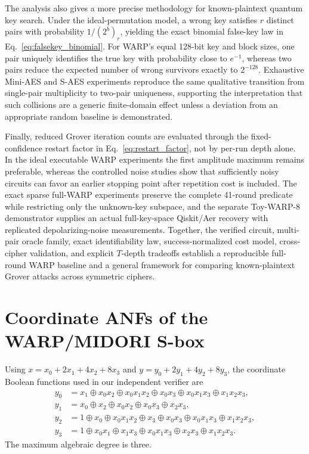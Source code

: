 \documentclass[10pt,a4paper]{article}
\begin{document}
The analysis also gives a more precise methodology for known-plaintext quantum key search.  Under the ideal-permutation model, a wrong key satisfies $r$ distinct pairs with probability $1/(2^b)_r$, yielding the exact binomial false-key law in Eq.~\eqref{eq:falsekey_binomial}.  For WARP's equal 128-bit key and block sizes, one pair uniquely identifies the true key with probability close to $e^{-1}$, whereas two pairs reduce the expected number of wrong survivors exactly to $2^{-128}$.  Exhaustive Mini-AES and S-AES experiments reproduce the same qualitative transition from single-pair multiplicity to two-pair uniqueness, supporting the interpretation that such collisions are a generic finite-domain effect unless a deviation from an appropriate random baseline is demonstrated.

Finally, reduced Grover iteration counts are evaluated through the fixed-confidence restart factor in Eq.~\eqref{eq:restart_factor}, not by per-run depth alone.  In the ideal executable WARP experiments the first amplitude maximum remains preferable, whereas the controlled noise studies show that sufficiently noisy circuits can favor an earlier stopping point after repetition cost is included.  The exact sparse full-WARP experiments preserve the complete 41-round predicate while restricting only the unknown-key subspace, and the separate Toy-WARP-8 demonstrator supplies an actual full-key-space Qiskit/Aer recovery with replicated depolarizing-noise measurements.  Together, the verified circuit, multi-pair oracle family, exact identifiability law, success-normalized cost model, cross-cipher validation, and explicit $T$-depth tradeoffs establish a reproducible full-round WARP baseline and a general framework for comparing known-plaintext Grover attacks across symmetric ciphers.

\appendix
\section{Coordinate ANFs of the WARP/MIDORI S-box}
Using $x=x_0+2x_1+4x_2+8x_3$ and $y=y_0+2y_1+4y_2+8y_3$, the coordinate Boolean functions used in our independent verifier are
\begin{align}
y_0 &= x_1 \oplus x_0x_2 \oplus x_0x_1x_2 \oplus x_0x_3 \oplus x_0x_1x_3 \oplus x_1x_2x_3,\\
y_1 &= x_0 \oplus x_2 \oplus x_0x_2 \oplus x_0x_3 \oplus x_2x_3,\\
y_2 &= 1 \oplus x_0 \oplus x_0x_1x_2 \oplus x_3 \oplus x_0x_3 \oplus x_0x_1x_3 \oplus x_1x_2x_3,\\
y_3 &= 1 \oplus x_0x_1 \oplus x_1x_3 \oplus x_0x_1x_3 \oplus x_2x_3 \oplus x_1x_2x_3.
\end{align}
The maximum algebraic degree is three.
\end{document}
